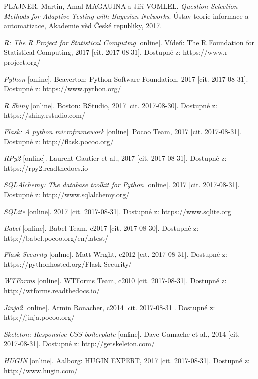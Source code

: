 \documentclass[a4paper,twoside,12pt]{scrbook}
\begin{document}
\begin{thebibliography}{99}
	 PLAJNER, Martin, Amal MAGAUINA a Jiří VOMLEL. \textit{Question Selection Methods for Adaptive Testing with Bayesian Networks}. Ústav teorie informace a automatizace, Akademie věd České republiky, 2017.


	 \textit{R: The R Project for Statistical Computing} [online]. Vídeň: The R Foundation for Statistical Computing, 2017 [cit. 2017-08-31]. Dostupné z: https://www.r-project.org/

	 \textit{Python} [online]. Beaverton: Python Software Foundation, 2017 [cit. 2017-08-31]. Dostupné z: https://www.python.org/

	 \textit{R Shiny} [online]. Boston: RStudio, 2017 [cit. 2017-08-30]. Dostupné z: https://shiny.rstudio.com/

	 \textit{Flask: A python microframework} [online]. Pocoo Team, 2017 [cit. 2017-08-31]. Dostupné z: http://flask.pocoo.org/

	 \textit{RPy2} [online]. Laurent Gautier et al., 2017 [cit. 2017-08-31]. Dostupné z: https://rpy2.readthedocs.io

	 \textit{SQLAlchemy: The database toolkit for Python} [online]. 2017 [cit. 2017-08-31]. Dostupné z: http://www.sqlalchemy.org/

	 \textit{SQLite} [online]. 2017 [cit. 2017-08-31]. Dostupné z: https://www.sqlite.org

	 \textit{Babel} [online]. Babel Team, c2017 [cit. 2017-08-30]. Dostupné z: http://babel.pocoo.org/en/latest/

	 \textit{Flask-Security} [online]. Matt Wright, c2012 [cit. 2017-08-31]. Dostupné z: https://pythonhosted.org/Flask-Security/

	 \textit{WTForms} [online]. WTForms Team, c2010 [cit. 2017-08-31]. Dostupné z: http://wtforms.readthedocs.io/

	 \textit{Jinja2} [online]. Armin Ronacher, c2014 [cit. 2017-08-31]. Dostupné z: http://jinja.pocoo.org/

	 \textit{Skeleton: Responsive CSS boilerplate} [online]. Dave Gamache et al., 2014 [cit. 2017-08-31]. Dostupné z: http://getskeleton.com/

	 \textit{HUGIN} [online]. Aalborg: HUGIN EXPERT, 2017 [cit. 2017-08-31]. Dostupné z: http://www.hugin.com/


\end{thebibliography}
\end{document}
